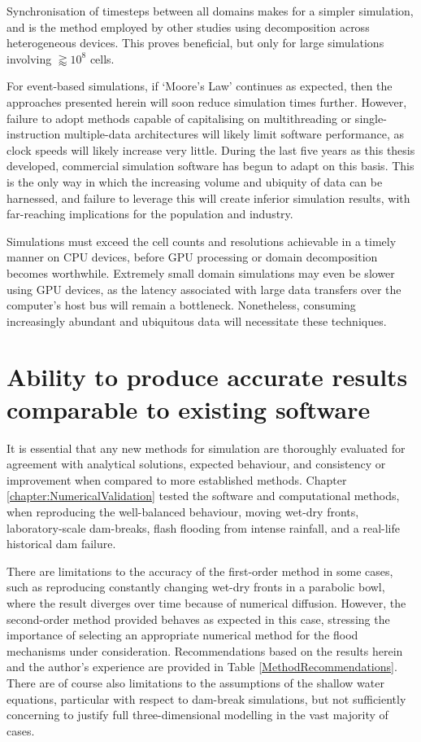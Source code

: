 Synchronisation of timesteps between all domains makes for a simpler simulation, and is the method employed by other studies using decomposition across heterogeneous devices. This proves beneficial, but only for large simulations involving $\gtrapprox10^8$ cells.

For event-based simulations, if `Moore's Law' continues as expected, then the approaches presented herein will soon reduce simulation times further. However, failure to adopt methods capable of capitalising on multithreading or single-instruction multiple-data architectures will likely limit software performance, as clock speeds will likely increase very little. During the last five years as this thesis developed, commercial simulation software has begun to adapt on this basis. This is the only way in which the increasing volume and ubiquity of data can be harnessed, and failure to leverage this will create inferior simulation results, with far-reaching implications for the population and industry.

Simulations must exceed the cell counts and resolutions achievable in a timely manner on CPU devices, before GPU processing or domain decomposition becomes worthwhile. Extremely small domain simulations may even be slower using GPU devices, as the latency associated with large data transfers over the computer's host bus will remain a bottleneck. Nonetheless, consuming increasingly abundant and ubiquitous data will necessitate these techniques.

\section{Ability to produce accurate results comparable to existing software}

It is essential that any new methods for simulation are thoroughly evaluated for agreement with analytical solutions, expected behaviour, and consistency or improvement when compared to more established methods. Chapter \ref{chapter:NumericalValidation} tested the software and computational methods, when reproducing the well-balanced behaviour, moving wet-dry fronts, laboratory-scale dam-breaks, flash flooding from intense rainfall, and a real-life historical dam failure.

There are limitations to the accuracy of the first-order method in some cases, such as reproducing constantly changing wet-dry fronts in a parabolic bowl, where the result diverges over time because of numerical diffusion. However, the second-order method provided behaves as expected in this case, stressing the importance of selecting an appropriate numerical method for the flood mechanisms under consideration. Recommendations based on the results herein and the author's experience are provided in Table \ref{MethodRecommendations}. There are of course also limitations to the assumptions of the shallow water equations, particular with respect to dam-break simulations, but not sufficiently concerning to justify full three-dimensional modelling in the vast majority of cases.

